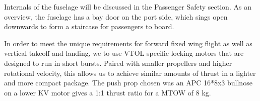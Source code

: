 Internals of the fuselage will be discussed in the Passenger Safety section. As an
overview, the fuselage has a bay door on the port side, which sings open downwards
to form a staircase for passengers to board.

In order to meet the unique requirements for forward fixed wing flight as well as
vertical takeoff and landing, we to use VTOL specific locking motors that are 
designed to run in short bursts. Paired with smaller propellers and higher rotational
velocity, this allows us to achieve similar amounts of thrust in a lighter and more
compact package. The push prop chosen was an APC 16*8x3 bullnose on a lower KV motor
gives a 1:1 thrust ratio for a MTOW of 8 kg.